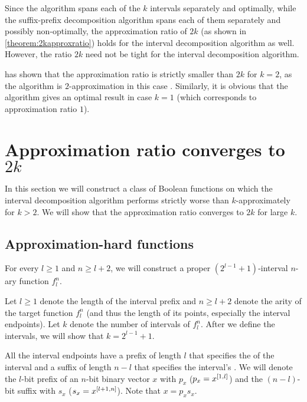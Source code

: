 Since the algorithm
spans each of the $k$ intervals separately and optimally,
while the suffix-prefix decomposition algorithm
spans each of them separately and possibly non-optimally,
the approximation ratio of $2k$
(as shown in \autoref{theorem:2kapproxratio})
holds for the interval decomposition algorithm as well.
However,
the ratio $2k$ need not be tight
for the interval decomposition algorithm.

\citeauthor{Dubovsky2012} has shown
that the approximation ratio is strictly smaller than $2k$
for $k = 2$,
as the algorithm is $2$-approximation
in this case \citep[p.~39]{Dubovsky2012}. %
Similarly,
it is obvious that the algorithm
gives an optimal result in case $k = 1$
(which corresponds to approximation ratio $1$).

\section{Approximation ratio converges
to \texorpdfstring{$2k$}{2k}}

In this section
we will construct a class of Boolean functions
on which the interval decomposition algorithm
performs strictly worse than $k$-approximately
for $k > 2$.
We will show that the approximation ratio converges to $2k$
for large $k$.

\subsection{Approximation-hard functions}

For every $l \geq 1$ and $n \geq l+2$,
we will construct
a proper $(2^{l-1} + 1)$-interval $n$-ary function $f_l^n$.

Let $l \geq 1$
denote the length of the interval  prefix
and $n \geq l+2$
denote the arity of the target function $f_l^n$
(and thus the length of its points,
especially the interval endpoints).
Let $k$ denote the number of intervals of $f_l^n$.
After we define the intervals,
we will show that $k = 2^{l-1} + 1$.

All the interval endpoints have a prefix of length $l$
that specifies the  of the interval
and a suffix of length $n - l$
that specifies the interval's .
We will denote the $l$-bit  prefix
of an $n$-bit binary vector $x$ with $p_x$
($p_x = x^{[1, l]}$)
and the $(n-l)$-bit  suffix with $s_x$
($s_x = x^{[l+1, n]}$).
Note that $x = p_x s_x$.

